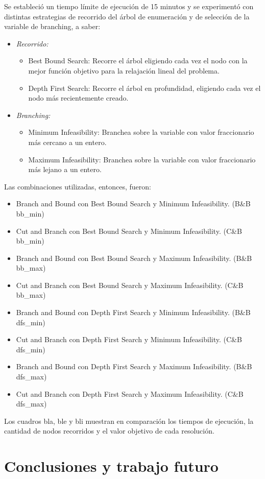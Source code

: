 \documentclass[a4paper]{article}
\begin{document}
Se estableció un tiempo límite de ejecución de 15 minutos y se experimentó con distintas estrategias de recorrido del árbol de enumeración y de selección de la variable de branching, a saber:

\begin{itemize}
	\item {\it Recorrido:}
	\begin{itemize}
		\item Best Bound Search: Recorre el árbol eligiendo cada vez el nodo con la mejor función objetivo para la relajación lineal del problema.
		\item Depth First Search: Recorre el árbol en profundidad, eligiendo cada vez el nodo más recientemente creado.
	\end{itemize}
	\item {\it Branching:}
	\begin{itemize}
		\item Minimum Infeasibility: Branchea sobre la variable con valor fraccionario más cercano a un entero.
		\item Maximum Infeasibility: Branchea sobre la variable con valor fraccionario más lejano a un entero.
	\end{itemize}
\end{itemize}

Las combinaciones utilizadas, entonces, fueron:

\begin{itemize}
	\item Branch and Bound con Best Bound Search y Minimum Infeasibility. (B\&B bb_min)
	\item Cut and Branch con Best Bound Search y Minimum Infeasibility. (C\&B bb_min)
	\item Branch and Bound con Best Bound Search y Maximum Infeasibility. (B\&B bb_max)
	\item Cut and Branch con Best Bound Search y Maximum Infeasibility. (C\&B bb_max)
	\item Branch and Bound con Depth First Search y Minimum Infeasibility. (B\&B dfs_min)
	\item Cut and Branch con Depth First Search y Minimum Infeasibility. (C\&B dfs_min)
	\item Branch and Bound con Depth First Search y Maximum Infeasibility. (B\&B dfs_max)
	\item Cut and Branch con Depth First Search y Maximum Infeasibility. (C\&B dfs_max)
\end{itemize}

Los cuadros bla, ble y bli muestran en comparación los tiempos de ejecución, la cantidad de nodos recorridos y el valor objetivo de cada resolución.

\newpage

\section{Conclusiones y trabajo futuro} 
\end{document}
